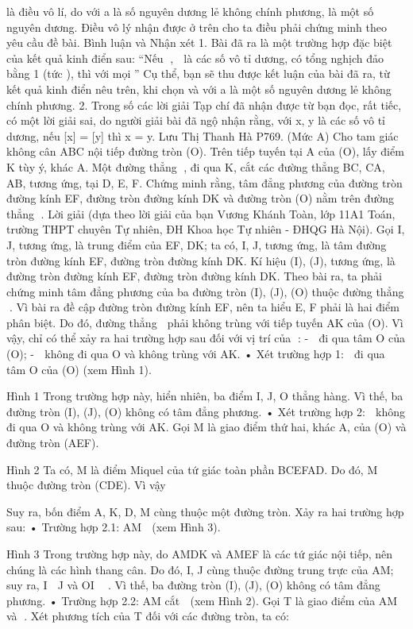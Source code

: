 \begin{multicols}{2}
	là điều vô lí, do với a là số nguyên dương lẻ không chính phương,   là một số nguyên dương.
	Điều vô lý nhận được ở trên cho ta điều phải chứng minh theo yêu cầu đề bài.
	Bình luận và Nhận xét
	1. Bài đã ra là một trường hợp đặc biệt của kết quả kinh điển sau:
	“Nếu ,  là các số vô tỉ dương, có tổng nghịch đảo bằng 1 (tức  ), thì với mọi    ”
	Cụ thể, bạn sẽ thu được kết luận của bài đã ra, từ kết quả kinh điển nêu trên, khi chọn   và   với a là một số nguyên dương lẻ không chính phương.
	2. Trong số các lời giải Tạp chí đã nhận được từ bạn đọc, rất tiếc, có một lời giải sai, do người giải bài đã ngộ nhận rằng, với x, y là các số vô tỉ dương, nếu [x] = [y] thì x = y.
	Lưu Thị Thanh Hà
	P769. (Mức A) Cho tam giác không cân ABC nội tiếp đường tròn (O). Trên tiếp tuyến tại A của (O), lấy điểm K tùy ý, khác A. Một đường thẳng , đi qua K, cắt các đường thẳng BC, CA, AB, tương ứng, tại D, E, F. Chứng minh rằng, tâm đẳng phương của đường tròn đường kính EF, đường tròn đường kính DK và đường tròn (O) nằm trên đường thẳng .
	Lời giải (dựa theo lời giải của bạn Vương Khánh Toàn, lớp 11A1 Toán, trường THPT chuyên Tự nhiên, ĐH Khoa học Tự nhiên - ĐHQG Hà Nội).
	Gọi I, J, tương ứng, là trung điểm của EF, DK; ta có, I, J, tương ứng, là tâm đường tròn đường kính EF, đường tròn đường kính DK.
	Kí hiệu (I), (J), tương ứng, là đường tròn đường kính EF, đường tròn đường kính DK.
	Theo bài ra, ta phải chứng minh tâm đẳng phương của ba đường tròn (I), (J), (O) thuộc đường thẳng .
	Vì bài ra đề cập đường tròn đường kính EF, nên ta hiểu E, F phải là hai điểm phân biệt. Do đó, đường thẳng  phải không trùng với tiếp tuyến AK của (O). Vì vậy, chỉ có thể xảy ra hai trường hợp sau đối với vị trí của :
	-  đi qua tâm O của (O);
	-  không đi qua O và không trùng với AK.
	• Xét trường hợp 1:  đi qua tâm O của (O) (xem Hình 1).
	
	Hình 1
	Trong trường hợp này, hiển nhiên, ba điểm I, J, O thẳng hàng. Vì thế, ba đường tròn (I), (J), (O) không có tâm đẳng phương.
	• Xét trường hợp 2:  không đi qua O và không trùng với AK.
	Gọi M là giao điểm thứ hai, khác A, của (O) và đường tròn (AEF).
	
	Hình 2
	Ta có, M là điểm Miquel của tứ giác toàn phần BCEFAD. Do đó, M thuộc đường tròn (CDE). Vì vậy
	
	Suy ra, bốn điểm A, K, D, M cùng thuộc một đường tròn.
	Xảy ra hai trường hợp sau:
	• Trường hợp 2.1: AM \parallel  (xem Hình 3).
	
	Hình 3
	Trong trường hợp này, do AMDK và AMEF là các tứ giác nội tiếp, nên chúng là các hình thang cân. Do đó, I, J cùng thuộc đường trung trực của AM; suy ra, I  J và OI  . Vì thế, ba đường tròn (I), (J), (O) không có tâm đẳng phương.
	• Trường hợp 2.2: AM cắt  (xem Hình 2).
	Gọi T là giao điểm của AM và . Xét phương tích của T đối với các đường tròn, ta có:
	

\end{multicols}
